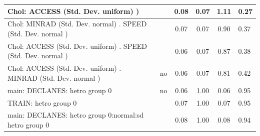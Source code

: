 \begin{table}
\begin{center}
\begin{tabular}{|l|l|c|c|c|l|}
			\hline
			 Chol: ACCESS (Std. Dev. uniform) ) &  & 0.08 & 0.07 & 1.11 & 0.27 \\
			\hline
			 Chol: MINRAD (Std. Dev. normal) . SPEED (Std. Dev.   normal ) &  & 0.07 & 0.07 & 0.90 & 0.37 \\
			\hline
			 Chol: ACCESS (Std. Dev. uniform) . SPEED (Std. Dev.   normal ) &  & 0.06 & 0.07 & 0.87 & 0.38 \\
			\hline
			 Chol: ACCESS (Std. Dev. uniform) . MINRAD (Std. Dev.   normal ) & no & 0.06 & 0.07 & 0.81 & 0.42 \\
			\hline
			main: DECLANES: hetro group 0 & no & 0.06 & 1.00 & 0.06 & 0.95 \\
			\hline
			TRAIN: hetro group 0 &  & 0.07 & 1.00 & 0.07 & 0.95 \\
			\hline
			main: DECLANES: hetro group 0:normal:sd  hetro group 0 &  & 0.08 & 1.00 & 0.08 & 0.94 \\
			\hline
		\end{tabular}
	\end{center}
\end{table}